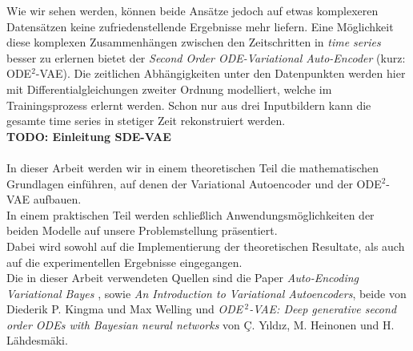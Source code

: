 \documentclass[12pt]{article}
\begin{document}
	Wie wir sehen werden, können beide Ansätze jedoch auf etwas komplexeren Datensätzen keine zufriedenstellende Ergebnisse mehr liefern.
	Eine Möglichkeit diese komplexen Zusammenhängen zwischen den Zeitschritten in \emph{time series} besser zu erlernen bietet der \emph{Second Order ODE-Variational Auto-Encoder} (kurz: ODE$^2$-VAE). Die zeitlichen Abhängigkeiten unter den Datenpunkten werden hier mit Differentialgleichungen zweiter Ordnung modelliert, welche im Trainingsprozess erlernt werden. Schon nur aus drei Inputbildern kann die gesamte time series in stetiger Zeit rekonstruiert werden.\\
	\textbf{TODO: Einleitung SDE-VAE}
	\\
	\\
	In dieser Arbeit werden wir in einem theoretischen Teil die mathematischen Grundlagen einführen, auf denen der Variational Autoencoder und der ODE$^2$-VAE aufbauen.\\
	In einem praktischen Teil werden schließlich Anwendungsmöglichkeiten der beiden Modelle auf unsere Problemstellung präsentiert.\\
	Dabei wird sowohl auf die Implementierung der
	theoretischen Resultate, als auch auf die experimentellen Ergebnisse eingegangen.\\
	Die in dieser Arbeit verwendeten Quellen sind die Paper \emph{Auto-Encoding Variational Bayes} \cite{vae}, sowie \emph{An Introduction to Variational Autoencoders}, \cite{intvae} beide von Diederik P. Kingma und Max Welling und \emph{ODE$^{\ 2}$-VAE: Deep generative second order ODEs with Bayesian neural networks} \cite{ode2vae} von Ç. Yıldız, M. Heinonen und H. Lähdesmäki.
	\newpage
	
\end{document}
